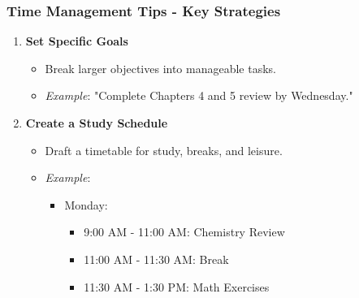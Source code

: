 \documentclass[aspectratio=169]{beamer}
\begin{document}
\begin{frame}[fragile]
    \frametitle{Time Management Tips - Key Strategies}
    \begin{enumerate}
        \item \textbf{Set Specific Goals}
            \begin{itemize}
                \item Break larger objectives into manageable tasks.
                \item \textit{Example}: "Complete Chapters 4 and 5 review by Wednesday."
            \end{itemize}

        \item \textbf{Create a Study Schedule}
            \begin{itemize}
                \item Draft a timetable for study, breaks, and leisure.
                \item \textit{Example}: 
                    \begin{itemize}
                        \item Monday: 
                        \begin{itemize}
                            \item 9:00 AM - 11:00 AM: Chemistry Review
                            \item 11:00 AM - 11:30 AM: Break
                            \item 11:30 AM - 1:30 PM: Math Exercises
                        \end{itemize}
                    \end{itemize}
            \end{itemize}
    \end{enumerate}
\end{frame}
\end{document}
